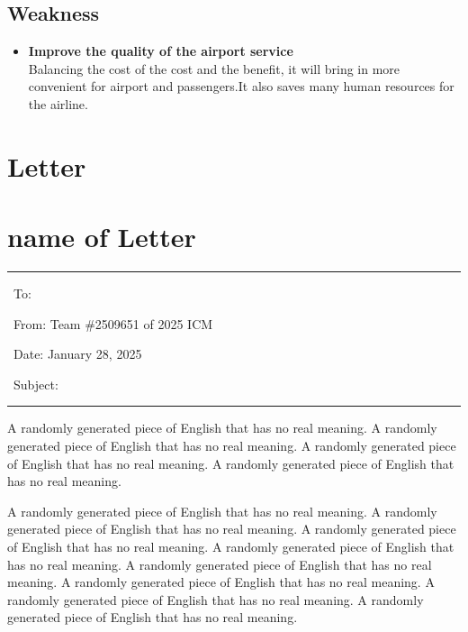 \documentclass{mcmthesis}
\begin{document}
	\subsection{Weakness}
	\begin{itemize}
		\item \textbf{Improve the quality of the airport service}\\
		Balancing the cost of the cost and the benefit, it will bring in
		more convenient  for airport and passengers.It also saves many
		human resources for the airline. 
	\end{itemize}
	\newpage
	\section{Letter}
	{\centering\section*{name of Letter}}
	
	\newcommand{\tnewroman}{\fontspec{Times New Roman}}
	\newcommand{\adobegothicstdb}{\fontspec{Adobe Gothic Std B}}
	\newcommand{\Centaur}{\fontspec{Centaur}}
	
	
	\noindent\rule{\textwidth}{1pt}
	
	\vspace{-0.2cm}
	
	\noindent \ To: 
	
	\vspace{-0.2cm}
	
	\noindent \ From: Team \#2509651 of 2025 ICM
	
	\vspace{-0.2cm}
	
	\noindent \ Date: January 28, 2025
	
	\vspace{-0.2cm}
	
	\noindent \ Subject:
	
	\vspace{-0.4cm}
	
	\noindent\rule{\textwidth}{1pt}
	
	A randomly generated piece of English that has no real meaning. A randomly generated piece of English that has no real meaning. A randomly generated piece of English that has no real meaning. A randomly generated piece of English that has no real meaning. 
	
	
	A randomly generated piece of English that has no real meaning. A randomly generated piece of English that has no real meaning. A randomly generated piece of English that has no real meaning. A randomly generated piece of English that has no real meaning. A randomly generated piece of English that has no real meaning. A randomly generated piece of English that has no real meaning. A randomly generated piece of English that has no real meaning. A randomly generated piece of English that has no real meaning. 
	
\end{document}
